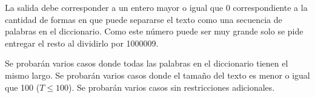 \documentclass{oci}
\begin{document}
\begin{outputDescription}
  La salida debe corresponder a un entero mayor o igual que 0 correspondiente a
  la cantidad de formas en que puede separarse el texto como una secuencia de
  palabras en el diccionario.
  Como este número puede ser muy grande solo se pide entregar el resto al
  dividirlo por 1000009.
\end{outputDescription}

\begin{scoreDescription}
   Se probarán varios casos donde todas las palabras en el diccionario
  tienen el mismo largo.
   Se probarán varios casos donde el tamaño del texto es menor o igual
  que 100 ($T \leq 100$).
   Se probarán varios casos sin restricciones adicionales.
\end{scoreDescription}

\begin{sampleDescription}
\end{sampleDescription}
\end{document}
